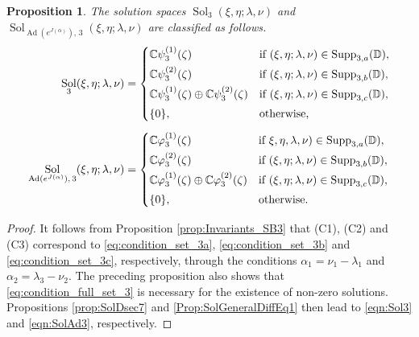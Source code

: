\documentclass[a4paper,11pt,reqno]{amsart}
\newcommand{\DD}{\mathbb{D}}
\newcommand{\0}{{\bf 0}}
\newcommand{\C}{\mathbb{C}}
\newcommand{\1}{{\bf 1}}
\DeclareMathOperator{\Ad}{Ad}
\DeclareMathOperator{\Supp}{Supp}
\DeclareMathOperator{\Sol}{Sol}
\theoremstyle{plain}
\newtheorem{proposition}[equation]{Proposition}
\theoremstyle{definition}
\numberwithin{equation}{section}
\theoremstyle{definition}
\begin{document}
\begin{proposition}\label{prop:Sol_3_characterization}
The solution spaces 
$\Sol_3(\xi, \eta; \lambda, \nu)$ and 
$\Sol_{\Ad(e^{J(\alpha)}),\, 3}(\xi,\eta; \lambda,\nu)$ are classified as follows.
\begin{align}
\Sol_3(\xi, \eta; \lambda, \nu) 
&= 
\begin{cases}
\C\psi_3^{(1)}(\zeta) & \textnormal{if $(\xi, \eta; \lambda, \nu) \in \Supp_{3,a}(\DD)$},\\[3pt]
\C\psi_3^{(2)}(\zeta) & \textnormal{if $(\xi, \eta; \lambda, \nu) \in \Supp_{3,b}(\DD)$},\\[3pt]
\C\psi_3^{(1)}(\zeta) \oplus \C\psi_3^{(2)}(\zeta) & 
\textnormal{if $(\xi, \eta; \lambda, \nu) \in \Supp_{3,c}(\DD)$},\\[3pt]
\{0\}, & \textnormal{otherwise,}\\
\end{cases}\label{eqn:Sol3}\\[5pt]
\Sol_{\Ad(e^{J(\alpha)}),\, 3}(\xi,\eta; \lambda,\nu)
&= 
\begin{cases}
\C\varphi_3^{(1)}(\zeta) & \textnormal{if $\xi, \eta, \lambda, \nu) \in \Supp_{3,a}(\DD)$},\\[3pt]
\C\varphi_3^{(2)}(\zeta) & \textnormal{if $(\xi, \eta; \lambda, \nu) \in \Supp_{3,b}(\DD)$},\\[3pt]
\C\varphi_3^{(1)}(\zeta) \oplus \C\varphi_3^{(2)}(\zeta) &
\textnormal{if $(\xi, \eta; \lambda, \nu) \in \Supp_{3,c}(\DD)$},\\[3pt]
\{0\}, & \textnormal{otherwise}.\\
\end{cases}\label{eqn:SolAd3}
\end{align}
\end{proposition}

\begin{proof}
It follows from Proposition \ref{prop:Invariants_SB3}  that 
(C1), (C2) and (C3) correspond to 
\eqref{eq:condition_set_3a}, 
\eqref{eq:condition_set_3b} and 
\eqref{eq:condition_set_3c}, respectively, 
through the conditions
$\alpha_1=\nu_1-\lambda_1$ and $\alpha_2 = \lambda_3-\nu_2$.
The preceding proposition also shows that 
\eqref{eq:condition_full_set_3} is necessary for the existence of non-zero solutions.
Propositions \ref{prop:SolDsec7} and \ref{Prop:SolGeneralDiffEq1}
then lead to  \eqref{eqn:Sol3} and \eqref{eqn:SolAd3}, respectively.
\end{proof}

\end{document}
